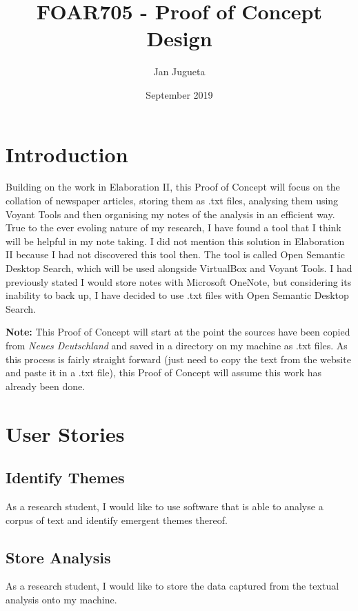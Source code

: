 \documentclass{article}
\title{FOAR705 - Proof of Concept Design}
\author{Jan Jugueta}
\date{September 2019}
\begin{document}
\maketitle

\section*{Introduction}

Building on the work in Elaboration II, this Proof of Concept will focus on the collation of newspaper articles, storing them as .txt files, analysing them using Voyant Tools and then organising my notes of the analysis in an efficient way. True to the ever evoling nature of my research, I have found a tool that I think will be helpful in my note taking. I did not mention this solution in Elaboration II because I had not discovered this tool then. The tool is called Open Semantic Desktop Search, which will be used alongside VirtualBox and Voyant Tools. I had previously stated I would store notes with Microsoft OneNote, but considering its inability to back up, I have decided to use .txt files with Open Semantic Desktop Search.

\textbf{Note:} This Proof of Concept will start at the point the sources have been copied from \textit{Neues Deutschland} and saved in a directory on my machine as .txt files. As this process is fairly straight forward (just need to copy the text from the website and paste it in a .txt file), this Proof of Concept will assume this work has already been done.

\section*{User Stories}

\subsection*{Identify Themes}

As a research student, I would like to use software that is able to analyse a corpus of text and identify emergent themes thereof.

\subsection*{Store Analysis}

As a research student, I would like to store the data captured from the textual analysis onto my machine.
\end{document}
